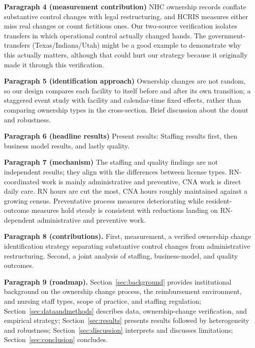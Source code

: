 \documentclass[12pt]{article}
\begin{document}
\medskip
\noindent\textbf{Paragraph 4 (measurement contribution)} NHC ownership records conflate substantive control changes with legal restructuring, and HCRIS measures either miss real changes or count fictitious ones. Our two-source verification isolates transfers in which operational control actually changed hands. The government-transfers (Texas/Indiana/Utah) might be a good example to demonstrate why this actually matters, although that could hurt our strategy because it originally made it through this verification.

\medskip
\noindent\textbf{Paragraph 5 (identification approach)} Ownership changes are not random, so our design compares each facility to itself before and after its own transition; a staggered event study with facility and calendar-time fixed effects, rather than comparing ownership types in the cross-section. Brief discussion about the donut and robustness.

\medskip
\noindent\textbf{Paragraph 6 (headline results)} Present results: Staffing results first, then business model results, and lastly quality.

\medskip
\noindent\textbf{Paragraph 7 (mechanism)} The staffing and quality findings are not independent results; they align with the differences between license types. RN-coordinated work is mainly administrative and preventive, CNA work is direct daily care. RN hours are cut the most, CNA hours roughly maintained against a growing census. Preventative process measures deteriorating while resident-outcome measures hold steady is consistent with reductions landing on RN-dependent administrative and preventive work.

\medskip
\noindent\textbf{Paragraph 8 (contributions).} First, measurement, a verified ownership change identification strategy separating substantive control changes from administrative restructuring. Second, a joint analysis of staffing, business-model, and quality outcomes. 

\medskip
\noindent\textbf{Paragraph 9 (roadmap).} Section~\ref{sec:background} provides institutional background on the ownership change process, the reimbursement environment, and nursing staff types, scope of practice, and staffing regulation; Section~\ref{sec:dataandmethods} describes data, ownership-change verification, and empirical strategy; Section~\ref{sec:results} presents results followed by heterogeneity and robustness; Section~\ref{sec:discussion} interprets and discusses limitations; Section~\ref{sec:conclusion} concludes.
\end{document}
